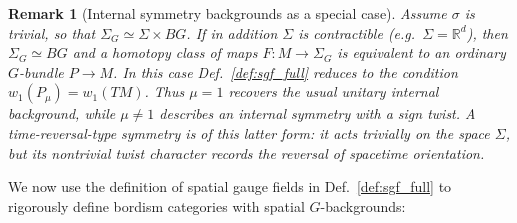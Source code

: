 \documentclass[aps,prx,reprint,superscriptaddress,twocolumn,amsmath,amssymb,amsfonts, nofootinbib]{revtex4-2}
\theoremstyle{apsstyle}
\newtheorem{remark}[theorem]{Remark}
\begin{document}
\bigskip

\begin{remark}[Internal symmetry backgrounds as a special case]
\label{remark:int_simplification}
Assume $\sigma$ is trivial, so that $\Sigma_G\simeq \Sigma\times BG$. If in addition $\Sigma$ is contractible (e.g.\ $\Sigma=\mathbb{R}^d$), then $\Sigma_G\simeq BG$ and a homotopy class of maps $F:M\to \Sigma_G$ is equivalent to an ordinary $G$-bundle $P\to M$. In this case Def.~\ref{def:sgf_full} reduces to the condition $w_1(P_\mu)=w_1(TM)$.
Thus $\mu=1$ recovers the usual unitary internal background, while $\mu\neq 1$ describes an internal symmetry with a sign twist. A time-reversal-type symmetry is of this latter form: it acts trivially on the space $\Sigma$, but its nontrivial twist character records the reversal of spacetime orientation.
\end{remark}

\bigskip 

We now use the definition of spatial gauge fields in Def.~\ref{def:sgf_full} to rigorously define bordism categories with spatial $G$-backgrounds:

\bigskip 
\end{document}
